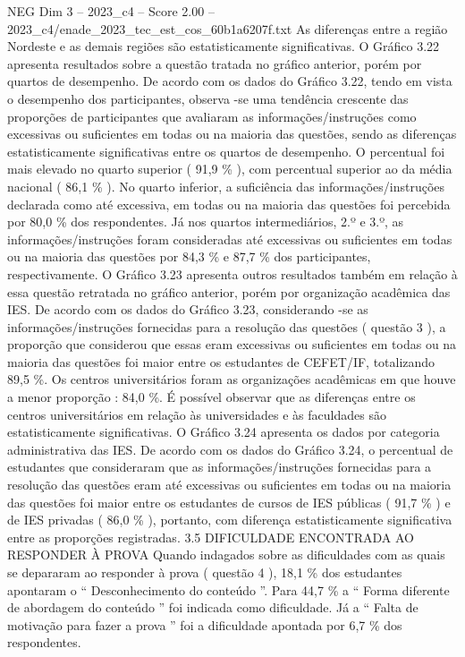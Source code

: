 \begin{textsample}{NEG Dim 3 – 2023\_c4 – Score 2.00 – 2023\_c4/enade\_2023\_tec\_est\_cos\_60b1a6207f.txt}
As diferenças entre a região Nordeste e as demais regiões são estatisticamente significativas.
O Gráfico 3.22 apresenta resultados sobre a questão tratada no gráfico anterior, porém por quartos de desempenho.
De acordo com os dados do Gráfico 3.22, tendo em vista o desempenho dos participantes, observa -se uma tendência crescente das proporções de participantes que avaliaram as informações/instruções como excessivas ou suficientes em todas ou na maioria das questões, sendo as diferenças estatisticamente significativas entre os quartos de desempenho.
O percentual foi mais elevado no quarto superior ( 91,9 \% ), com percentual superior ao da média nacional ( 86,1 \% ).
No quarto inferior, a suficiência das informações/instruções declarada como até excessiva, em todas ou na maioria das questões foi percebida por 80,0 \% dos respondentes.
Já nos quartos intermediários, 2.º e 3.º, as informações/instruções foram consideradas até excessivas ou suficientes em todas ou na maioria das questões por 84,3 \% e 87,7 \% dos participantes, respectivamente.
O Gráfico 3.23 apresenta outros resultados também em relação à essa questão retratada no gráfico anterior, porém por organização acadêmica das IES.
De acordo com os dados do Gráfico 3.23, considerando -se as informações/instruções fornecidas para a resolução das questões ( questão 3 ), a proporção que considerou que essas eram excessivas ou suficientes em todas ou na maioria das questões foi maior entre os estudantes de CEFET/IF, totalizando 89,5 \%.
Os centros universitários foram as organizações acadêmicas em que houve a menor proporção : 84,0 \%.
É possível observar que as diferenças entre os centros universitários em relação às universidades e às faculdades são estatisticamente significativas.
O Gráfico 3.24 apresenta os dados por categoria administrativa das IES.
De acordo com os dados do Gráfico 3.24, o percentual de estudantes que consideraram que as informações/instruções fornecidas para a resolução das questões eram até excessivas ou suficientes em todas ou na maioria das questões foi maior entre os estudantes de cursos de IES públicas ( 91,7 \% ) e de IES privadas ( 86,0 \% ), portanto, com diferença estatisticamente significativa entre as proporções registradas. 3.5 DIFICULDADE ENCONTRADA AO RESPONDER À PROVA Quando indagados sobre as dificuldades com as quais se depararam ao responder à prova ( questão 4 ), 18,1 \% dos estudantes apontaram o “ Desconhecimento do conteúdo ”.
Para 44,7 \% a “ Forma diferente de abordagem do conteúdo ” foi indicada como dificuldade.
Já a “ Falta de motivação para fazer a prova ” foi a dificuldade apontada por 6,7 \% dos respondentes.

\end{textsample}
